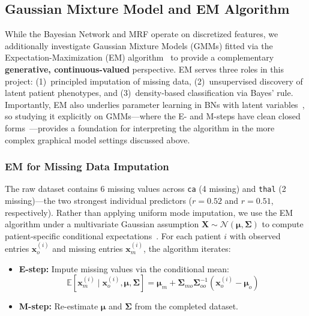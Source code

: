 
\subsection{Gaussian Mixture Model and EM Algorithm}

While the Bayesian Network and MRF operate on discretized features, we additionally investigate Gaussian Mixture Models (GMMs) fitted via the Expectation-Maximization (EM) algorithm~\cite{dempster1977em} to provide a complementary \textbf{generative, continuous-valued} perspective. EM serves three roles in this project: (1)~principled imputation of missing data, (2)~unsupervised discovery of latent patient phenotypes, and (3)~density-based classification via Bayes' rule. Importantly, EM also underlies parameter learning in BNs with latent variables~\cite{koller2009pgm}, so studying it explicitly on GMMs---where the E- and M-steps have clean closed forms~\cite{bishop2006prml}---provides a foundation for interpreting the algorithm in the more complex graphical model settings discussed above.

\subsubsection{EM for Missing Data Imputation}

The raw dataset contains 6 missing values across \texttt{ca} (4 missing) and \texttt{thal} (2 missing)---the two strongest individual predictors ($r = 0.52$ and $r = 0.51$, respectively). Rather than applying uniform mode imputation, we use the EM algorithm under a multivariate Gaussian assumption $\mathbf{X} \sim \mathcal{N}(\boldsymbol{\mu}, \boldsymbol{\Sigma})$ to compute patient-specific conditional expectations~\cite{little1987rubin}. For each patient $i$ with observed entries $\mathbf{x}_o^{(i)}$ and missing entries $\mathbf{x}_m^{(i)}$, the algorithm iterates:

\begin{itemize}
    \item \textbf{E-step:} Impute missing values via the conditional mean:
    \begin{equation}
        \mathbb{E}[\mathbf{x}_m^{(i)} \mid \mathbf{x}_o^{(i)}, \boldsymbol{\mu}, \boldsymbol{\Sigma}] = \boldsymbol{\mu}_m + \boldsymbol{\Sigma}_{mo}\boldsymbol{\Sigma}_{oo}^{-1}(\mathbf{x}_o^{(i)} - \boldsymbol{\mu}_o)
    \end{equation}
    \item \textbf{M-step:} Re-estimate $\boldsymbol{\mu}$ and $\boldsymbol{\Sigma}$ from the completed dataset.
\end{itemize}

